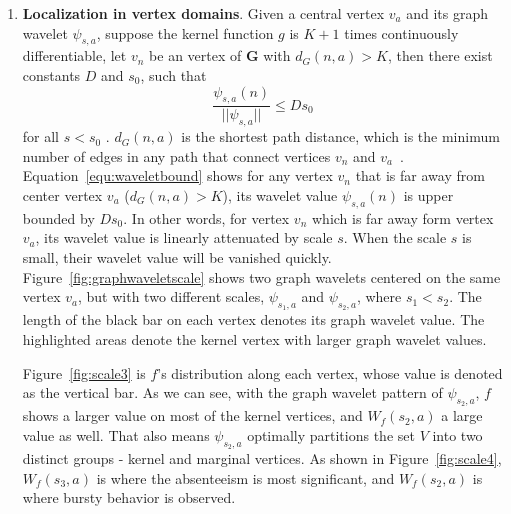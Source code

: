 \begin{enumerate}
\item \textbf{Localization in vertex domains}. Given a central vertex $v_a$ and its graph wavelet $\psi_{s,a}$, suppose the kernel function $g$ is $K+1$ times continuously differentiable, let $v_n$ be an vertex of $\mathbf{G}$ with $d_G(n,a)>K$, then there exist constants $D$ and $s_0$, such that
\begin{equation}
\label{equ:waveletbound}
\frac{\psi_{s,a}(n)}{||\psi_{s,a}||}\leq Ds_0
\end{equation} for all $s<s_0$ .
$d_G(n,a)$ is the shortest path distance, which is the minimum number of edges in any path that connect vertices $v_n$ and $v_a$~\cite{hammond2011wavelets}. Equation~\ref{equ:waveletbound} shows for any vertex $v_n$ that is far away from center vertex $v_a$ ($d_G(n,a)>K$), its wavelet value $\psi_{s,a}(n)$ is upper bounded by $Ds_0$. In other words, for vertex $v_n$ which is far away form vertex $v_a$, its wavelet value is linearly attenuated by scale $s$. When the scale $s$ is small, their wavelet value will be vanished quickly. Figure~\ref{fig:graphwaveletscale} shows two graph wavelets centered on the same vertex $v_a$, but with two different scales, $\psi_{s_1,a}$ and $\psi_{s_2, a}$, where $s_1<s_2$. The length of the black bar on each vertex denotes its graph wavelet value. The highlighted areas denote the kernel vertex with larger graph wavelet values.

Figure~\ref{fig:scale3} is $f$'s distribution along each vertex, whose value is denoted as the vertical bar. As we can see, with the graph wavelet pattern of $\psi_{s_2,a}$, $f$ shows a larger value on most of the kernel vertices, and $W_f(s_2,a)$ a large value as well. That also means $\psi_{s_2,a}$ optimally partitions the set $V$ into two distinct groups - kernel and marginal vertices. As shown in Figure~\ref{fig:scale4}, $W_f(s_3,a)$ is where the absenteeism is most significant, and $W_f(s_2,a)$ is  where bursty behavior is observed.
 \end{enumerate}
 
 

